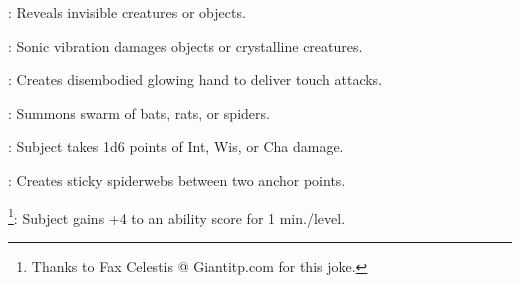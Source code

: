 \begin{list}{}{\leftmargin=1em}
\item {}: Reveals invisible creatures or objects.
\item {}: Sonic vibration damages objects or crystalline creatures.
\item {}: Creates disembodied glowing hand to deliver touch attacks.
\item {}: Summons swarm of bats, rats, or spiders.
\item {}: Subject takes 1d6 points of Int, Wis, or Cha damage.
\item {}: Creates sticky spiderwebs between two anchor points.
\item {}\footnote{Thanks to Fax Celestis @ Giantitp.com for this joke.}: Subject gains +4 to an ability score for 1 min./level.
\end{list}

